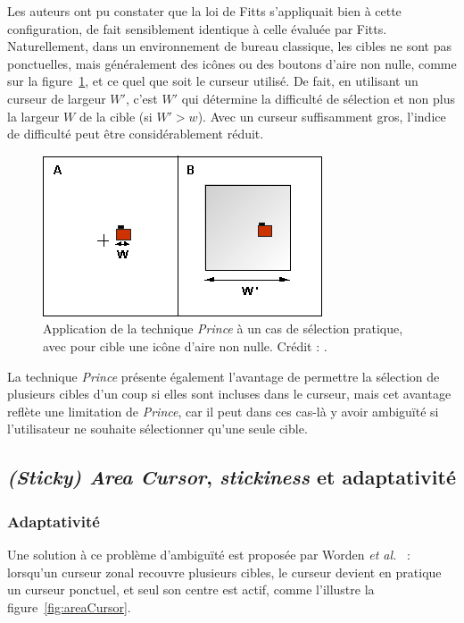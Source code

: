 	Les auteurs ont pu constater que la loi de Fitts s'appliquait bien à cette configuration, de fait sensiblement identique à celle évaluée par Fitts. Naturellement, dans un environnement de bureau classique, les cibles ne sont pas ponctuelles, mais généralement des icônes ou des boutons d'aire non nulle, comme sur la figure~\ref{fig:princeSelection}, et ce quel que soit le curseur utilisé. De fait, en utilisant un curseur de largeur $W'$, c'est $W'$ qui détermine la difficulté de sélection et non plus la largeur $W$ de la cible (si $W' > w$). Avec un curseur suffisamment gros, l'indice de difficulté peut être considérablement réduit.
	
	\begin{figure}[ht]
		\centering
		\includegraphics[width=\textwidth]{figures/ch2/princeSelection}
		\caption[\emph{Prince} dans un cas pratique]{Application de la technique \emph{Prince} à un cas de sélection pratique, avec pour cible une icône d'aire non nulle. Crédit : \cite{kabbash1995prince}.}
		\label{fig:princeSelection}
	\end{figure}
	
	La technique \emph{Prince} présente également l'avantage de permettre la sélection de plusieurs cibles d'un coup si elles sont incluses dans le curseur, mais cet avantage reflète une limitation de \emph{Prince}, car il peut dans ces cas-là y avoir ambiguïté si l'utilisateur ne souhaite sélectionner qu'une seule cible.
	
	\subsection{\emph{(Sticky) Area Cursor}, \emph{stickiness} et adaptativité}
		\subsubsection{Adaptativité}
	Une solution à ce problème d'ambiguïté est proposée par Worden \emph{et al.}~\cite{worden1997making} : lorsqu'un curseur zonal recouvre plusieurs cibles, le curseur devient en pratique un curseur ponctuel, et seul son centre est actif, comme l'illustre la figure~\ref{fig:areaCursor}.
	

